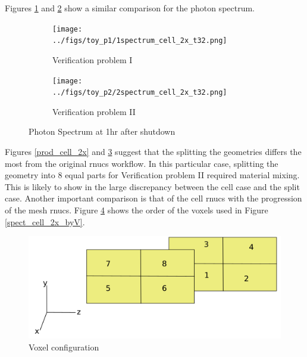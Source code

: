 Figures \ref{1spect_cell_2x} and \ref{2spect_cell_2x} show a similar
comparison for the photon spectrum.\\
\begin{figure}[h!]
 \begin{centering}
 \centering
 \begin{subfigure}[b]{.45\textwidth}
 \texttt{[image: ../figs/toy\_p1/1spectrum\_cell\_2x\_t32.png]}
 \caption{Verification problem I }
 \label{1spect_cell_2x}
 \end{subfigure}
 \hspace{0.05cm}
 \begin{subfigure}[b]{.45\textwidth}
 \centering
 \texttt{[image: ../figs/toy\_p2/2spectrum\_cell\_2x\_t32.png]}
 \caption{Verification problem II}
 \label{2spect_cell_2x}
 \end{subfigure}
 \caption{Photon Spectrum at 1hr after shutdown }
 \label{spect_cell_2x}
 \end{centering}
\end{figure}
Figures \ref{prod_cell_2x} and \ref{spect_cell_2x} suggest that the splitting the geometries 
differs the most from the original rnucs workflow. In this particular case, splitting the geometry 
into 8 equal parts for Verification problem II required material mixing.
This is likely to show in the large discrepancy between the cell case and the split case.
Another important comparison is that of the cell rnucs with the progression of the mesh rnucs. 
Figure \ref{voxels} shows the order of the voxels used in Figure \ref{spect_cell_2x_byV}. 


\begin{figure}[h]
\begin{centering}
\includegraphics[width=0.60\linewidth]{../figs/voxels.png}
\caption{Voxel configuration}
\label{voxels}
\end{centering}
\end{figure}

